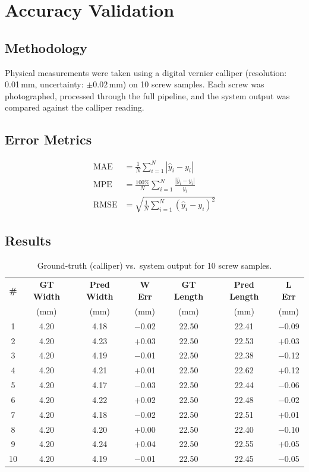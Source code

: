 \documentclass[12pt, a4paper, twoside]{report}
\begin{document}
\section{Accuracy Validation}

\subsection{Methodology}
Physical measurements were taken using a digital vernier calliper (resolution: 0.01\,mm, uncertainty: $\pm 0.02$\,mm) on 10 screw samples. Each screw was photographed, processed through the full pipeline, and the system output was compared against the calliper reading.

\subsection{Error Metrics}
\begin{align}
\text{MAE} &= \frac{1}{N}\sum_{i=1}^{N}\left|\hat{y}_i - y_i\right| \label{eq:mae} \\[6pt]
\text{MPE} &= \frac{100\%}{N}\sum_{i=1}^{N}\frac{|\hat{y}_i - y_i|}{y_i} \label{eq:mpe} \\[6pt]
\text{RMSE} &= \sqrt{\frac{1}{N}\sum_{i=1}^{N}(\hat{y}_i - y_i)^2} \label{eq:rmse}
\end{align}

\subsection{Results}
\begin{table}[H]
\centering
\caption{Ground-truth (calliper) vs.\ system output for 10 screw samples.}
\label{tab:accuracy-table}
\begin{tabular}{ccccccc}
\toprule
\textbf{\#} & \textbf{GT Width} & \textbf{Pred Width} & \textbf{W Err} & \textbf{GT Length} & \textbf{Pred Length} & \textbf{L Err} \\
& (mm) & (mm) & (mm) & (mm) & (mm) & (mm) \\
\midrule
1  & 4.20 & 4.18 & $-$0.02 & 22.50 & 22.41 & $-$0.09 \\
2  & 4.20 & 4.23 & $+$0.03 & 22.50 & 22.53 & $+$0.03 \\
3  & 4.20 & 4.19 & $-$0.01 & 22.50 & 22.38 & $-$0.12 \\
4  & 4.20 & 4.21 & $+$0.01 & 22.50 & 22.62 & $+$0.12 \\
5  & 4.20 & 4.17 & $-$0.03 & 22.50 & 22.44 & $-$0.06 \\
6  & 4.20 & 4.22 & $+$0.02 & 22.50 & 22.48 & $-$0.02 \\
7  & 4.20 & 4.18 & $-$0.02 & 22.50 & 22.51 & $+$0.01 \\
8  & 4.20 & 4.20 & $+$0.00 & 22.50 & 22.40 & $-$0.10 \\
9  & 4.20 & 4.24 & $+$0.04 & 22.50 & 22.55 & $+$0.05 \\
10 & 4.20 & 4.19 & $-$0.01 & 22.50 & 22.45 & $-$0.05 \\
\bottomrule
\end{tabular}
\end{table}
\end{document}
